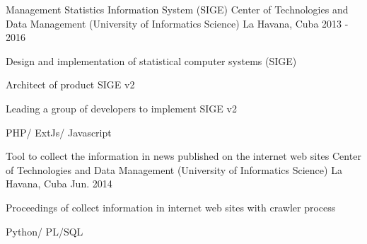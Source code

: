 \begin{cventries}

\cventry
{Management Statistics Information System (SIGE)} %
{Center of Technologies and Data Management (University of Informatics Science)} %
{La Havana, Cuba} %
{2013 - 2016} %
{ %
\begin{cvitems}
\item {Design and implementation of statistical computer systems (SIGE)}
\item {Architect of product SIGE v2}
\item {Leading a group of developers to implement SIGE v2}
\item {PHP/ ExtJs/ Javascript}
\end{cvitems}
}


\cventry
{Tool to collect the information in news published on the internet web sites} %
{Center of Technologies and Data Management (University of Informatics Science)} %
{La Havana, Cuba} %
{Jun. 2014} %
{ %
\begin{cvitems}
\item {Proceedings of collect information in internet web sites with crawler process}
\item {Python/ PL/SQL}
\end{cvitems}
}


\end{cventries}

